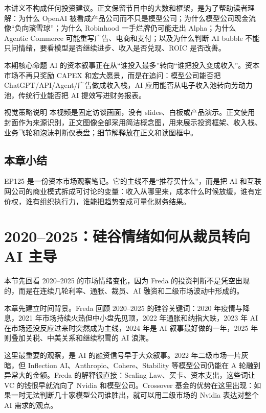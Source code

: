 \documentclass[a4paper]{article}
\begin{document}
本讲义不构成任何投资建议。正文保留节目中的大数和框架，是为了帮助读者理解：为什么 OpenAI 被看成产品公司而不只是模型公司；为什么模型公司现金流像“负向滚雪球”；为什么 Robinhood 一手烂牌仍可能走出 Alpha；为什么 Agentic Commerce 可能重写广告、电商和支付；以及为什么判断 AI bubble 不能只问情绪，要看模型是否继续进步、收入是否兑现、ROIC 是否改善。

\begin{importantbox}{本期核心命题}
AI 的资本叙事正在从“谁投入最多”转向“谁把投入变成收入”。资本市场不再只奖励 CAPEX 和宏大愿景，而是在追问：模型公司能否把 ChatGPT/API/Agent/广告做成收入栈，AI 应用能否从电子收入池转向劳动力池，传统行业能否把 AI 提效写进财务报表。
\end{importantbox}

\begin{knowledgebox}{视觉策略说明}
本视频是固定访谈画面，没有 slides、白板或产品演示。正文使用封面作为来源识别，正文图像全部采用简洁概念图，用来展示投资框架、收入栈、业务飞轮和泡沫判断仪表盘；细节解释放在正文和读图框中。
\end{knowledgebox}

\subsection{本章小结}

EP125 是一份资本市场观察笔记。它的主线不是“推荐买什么”，而是把 AI 和互联网公司的商业模式拆成可讨论的变量：收入从哪里来，成本什么时候放缓，谁有定价权，谁有组织执行力，谁能把趋势变成可量化财务结果。

\section{2020--2025：硅谷情绪如何从裁员转向 AI 主导}

本节先回看 2020--2025 的市场情绪变化，因为 Freda 的投资判断不是凭空出现的，而是在连续几轮利率、通胀、裁员、AI 融资和二级市场波动中形成的。

本章先建立时间背景。Freda 回顾 2020--2025 的硅谷关键词：2020 年疫情与降息，2021 年市场持续火热但中小盘先见顶，2022 年通胀和纳指大跌，2023 年 AI 在市场还没反应过来时突然成为主线，2024 年是 AI 叙事最好做的一年，2025 年则叠加关税、中美关系和继续积雪的 AI 浪潮。

这里最重要的观察，是 AI 的融资信号早于大众叙事。2022 年二级市场一片灰暗，但 Inflection AI、Anthropic、Cohere、Stability 等模型公司仍能在 A 轮融到异常大的金额。Freda 的解释很直接：Scaling Law、买卡、资本支出，这些词让 VC 的钱很早就流向了 Nvidia 和模型公司。Crossover 基金的优势在这里出现：如果一时无法判断几十家模型公司谁胜出，就可以用二级市场的 Nvidia 表达对整个 AI 需求的观点。
\end{document}

